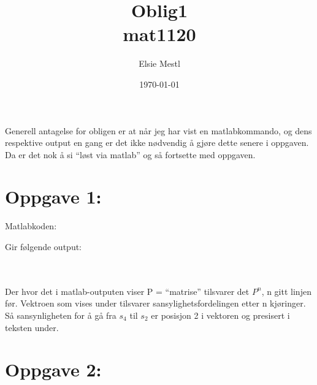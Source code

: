 \documentclass[a4paper, norsk, twoside, 10pt]{article}
\date{\today}
\title{Oblig1 \\ mat1120}
\author{Elsie Mestl}
\begin{document}
\maketitle
\begin{flushleft}

  \def\matrixP{
    \begin{bmatrix}
      1 & 0.7 & 0 & 0 & 0 \\
      0 & 0   & 0.5 & 0 & 0 \\
      0 & 0.3 & 0 & 0.65 & 0 \\
      0 & 0   & 0.5 & 0 & 0 \\
      0 & 0 & 0 & 0.35 & 1 \\
    \end{bmatrix}
  }


  Generell antagelse for obligen er at når jeg har vist en matlabkommando, og dens respektive output en gang er det ikke nødvendig å gjøre dette senere i oppgaven. Da er det nok å si ``løst via matlab'' og så fortsette med oppgaven.

  \newpage

  \section*{Oppgave 1:}
  Matlabkoden:
  
  
  Gir følgende output:
  
  \ \\
  \ \\
  Der hvor det i matlab-outputen viser P = ``matrise'' tilsvarer det $P^{n}$, n gitt linjen før. Vektroen som vises
  under tilsvarer sansylighetsfordelingen etter n kjøringer. Så sansynligheten for å gå fra $s_{4}$ til $s_{2}$ er posisjon 2 i vektoren
  og presisert i teksten under.


  \section*{Oppgave 2:}


\end{flushleft}
\end{document}
